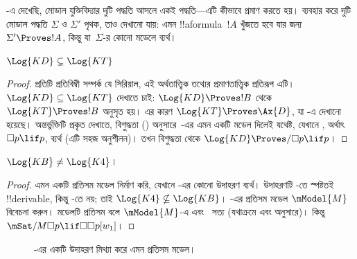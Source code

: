 \documentclass[../../../include/open-logic-section]{subfiles}
\begin{document}


-এ দেখেছি, মোডাল যুক্তিবিদ্যার দুটি পদ্ধতি আসলে একই পদ্ধতি—এটি কীভাবে প্রমাণ করতে হয়।  ব্যবহার করে দুটি মোডাল পদ্ধতি $\Sigma$ ও $\Sigma'$ পৃথক, তাও দেখানো যায়: এমন !!a{formula}~$!A$ খুঁজতে হবে যার জন্য $\Sigma' \Proves !A$, কিন্তু যা~$\Sigma$-র কোনো মডেলে ব্যর্থ।

\begin{prop}
  $\Log{KD} \subsetneq \Log{KT}$
\end{prop}

\begin{proof} প্রতিটি প্রতিবিম্বী সম্পর্ক যে সিরিয়াল, এই অর্থতাত্ত্বিক তথ্যের প্রমাণতাত্ত্বিক প্রতিরূপ এটি। $\Log{KD} \subseteq \Log{KT}$ দেখাতে চাই: $\Log{KD} \Proves !B$ থেকে $\Log{KT} \Proves !B$ অনুসৃত হয়।
  এর কারণ $\Log{KT} \Proves \Ax{D}$, যা -এ দেখানো হয়েছে। অন্তর্ভুক্তিটি প্রকৃত দেখাতে, বিশুদ্ধতা () অনুসারে~-এর এমন একটি মডেল দিলেই যথেষ্ট, যেখানে , অর্থাৎ $\Box p \lif p$, ব্যর্থ (এটি সহজ অনুশীলন)। তখন বিশুদ্ধতা থেকে $\Log{KD} \Proves/ \Box p \lif p$।
\end{proof}

\begin{prop}
  $\Log{KB} \neq \Log{K4}$।
\end{prop}

\begin{proof}
  এমন একটি প্রতিসম মডেল নির্মাণ করি, যেখানে -এর কোনো উদাহরণ ব্যর্থ। উদাহরণটি -তে স্পষ্টতই !!{derivable}, কিন্তু -তে নয়; তাই $\Log{K4} \nsubseteq \Log{KB}$। -এর প্রতিসম মডেল $\mModel{M}$ বিবেচনা করুন। মডেলটি প্রতিসম বলে $\mModel{M}$-এ  এবং~ সত্য (যথাক্রমে  এবং  অনুসারে)। কিন্তু $\mSat/{M}{\Box p \lif \Box\Box p}[w_1]$।
\end{proof}

\begin{figure}[htpb]
  \centering
  \caption{-এর একটি উদাহরণ মিথ্যা করে এমন প্রতিসম মডেল।}
\end{figure}
\end{document}
